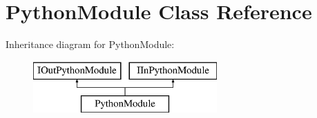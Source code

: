 \hypertarget{classPythonModule}{}\section{Python\+Module Class Reference}
\label{classPythonModule}
Inheritance diagram for Python\+Module\+:\begin{figure}[H]
\begin{center}
\leavevmode
\includegraphics[height=2.000000cm]{classPythonModule}
\end{center}
\end{figure}
